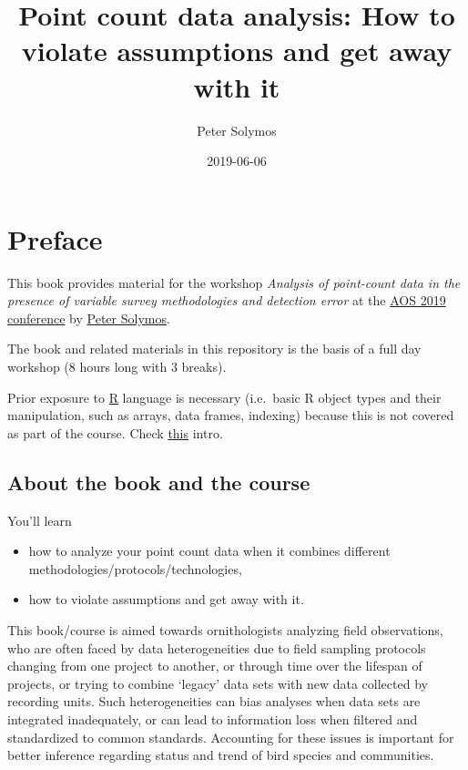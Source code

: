 \documentclass[12pt,]{book}
\title{Point count data analysis: How to violate assumptions and get away with it}
\author{Peter Solymos}
\date{2019-06-06}
\providecommand{\tightlist}{%
  \setlength{\itemsep}{0pt}\setlength{\parskip}{0pt}}
\begin{document}
\maketitle

{
\hypersetup{linkcolor=black}
\setcounter{tocdepth}{2}
\tableofcontents
}
\listoftables
\listoffigures
\hypertarget{foreword}{%
\chapter*{Preface}\label{foreword}}

This book provides material for the workshop
\emph{Analysis of point-count data in the presence of variable survey methodologies and detection error}
at the \href{https://amornithmeeting.org/}{AOS 2019 conference}
by \href{http://peter.solymos.org}{Peter Solymos}.

The book and related materials in this repository is the basis of a
full day workshop (8 hours long with 3 breaks).

Prior exposure to \href{https://www.r-project.org/}{R} language is necessary
(i.e.~basic R object types and their manipulation, such as arrays, data frames, indexing)
because this is not covered as part of the course.
Check \href{_etc/R-basics.pdf}{this} intro.

\hypertarget{about-the-book-and-the-course}{%
\section*{About the book and the course}\label{about-the-book-and-the-course}}

You'll learn

\begin{itemize}
\tightlist
\item
  how to analyze your point count data when it combines different methodologies/protocols/technologies,
\item
  how to violate assumptions and get away with it.
\end{itemize}

This book/course is aimed towards ornithologists analyzing field observations,
who are often faced by data heterogeneities due to
field sampling protocols changing from one project to another,
or through time over the lifespan of projects, or trying to combine
`legacy' data sets with new data collected by recording units.
Such heterogeneities can bias analyses when data sets are integrated
inadequately, or can lead to information loss when filtered and standardized to
common standards. Accounting for these issues is important for better
inference regarding status and trend of bird species and communities.
\end{document}
